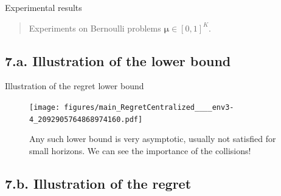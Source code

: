 \documentclass[12pt,english,ignorenonframetext,]{beamer}
\providecommand{\tightlist}{%
  \setlength{\itemsep}{0pt}\setlength{\parskip}{0pt}}
\begin{document}
\begin{frame}{Experimental results}

\begin{quote}
Experiments on Bernoulli problems \(\boldsymbol{\mu}\in[0,1]^K\).
\end{quote}


\end{frame}


\subsection{\hfill{}7.a. Illustration of the lower bound\hfill{}}

\begin{frame}[plain]{Illustration of the regret lower bound}

\begin{figure}[h!]
\texttt{[image: figures/main\_RegretCentralized\_\_\_\_env3-4\_2092905764868974160.pdf]}
\caption{\footnotesize{Any such lower bound is \alert{very asymptotic}, usually not satisfied for small horizons. We can see the importance of the collisions!}}
\end{figure}

\end{frame}



\subsection{\hfill{}7.b. Illustration of the regret\hfill{}}
\end{document}

